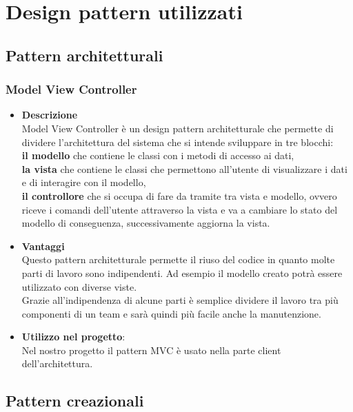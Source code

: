 \newcommand{\utilizzo}{\item \textbf{Utilizzo nel progetto}}

\section{Design pattern utilizzati}

\subsection{Pattern architetturali}
	\subsubsection{Model View Controller}
		\begin{itemize}
			\item \textbf{Descrizione} \\ Model View Controller è un design pattern architetturale che permette di dividere l'architettura del sistema che si intende sviluppare in tre blocchi: \\
			\textbf{il modello} che contiene le classi con i metodi di accesso ai dati, \\
			\textbf{la vista} che contiene le classi che permettono all'utente di visualizzare i dati e di interagire con il modello, \\
			\textbf{il controllore} che si occupa di fare da tramite tra vista e modello, ovvero riceve i comandi dell'utente attraverso la vista e va a cambiare lo stato del modello di conseguenza, successivamente aggiorna la vista. \\
			
			\item \textbf{Vantaggi} \\
			Questo pattern architetturale permette il riuso del codice in quanto molte parti di lavoro sono indipendenti. Ad esempio il modello creato potrà essere utilizzato con diverse viste. \\ Grazie all'indipendenza di alcune parti è semplice dividere il lavoro tra più componenti di un team e sarà quindi più facile anche la manutenzione.
			\utilizzo: \\
			Nel nostro progetto il pattern MVC è usato nella parte client dell'architettura. 
		\end{itemize}
		
\subsection{Pattern creazionali}
